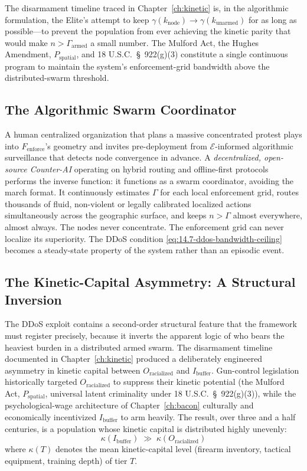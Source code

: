 The disarmament timeline traced in Chapter~\ref{ch:kinetic} is, in the algorithmic formulation, the Elite's attempt to keep $\gamma(k_{\text{node}}) \to \gamma(k_{\text{unarmed}})$ for as long as possible---to prevent the population from ever achieving the kinetic parity that would make $n > \Gamma_{\text{armed}}$ a small number. The Mulford Act, the Hughes Amendment, $P_{\text{spatial}}$, and 18 U.S.C.~\S~922(g)(3) constitute a single continuous program to maintain the system's enforcement-grid bandwidth above the distributed-swarm threshold.

\subsection{The Algorithmic Swarm Coordinator}

A human centralized organization that plans a massive concentrated protest plays into $F_{\text{enforce}}$'s geometry and invites pre-deployment from $\mathcal{E}$-informed algorithmic surveillance that detects node convergence in advance. A \textit{decentralized, open-source Counter-AI} operating on hybrid routing and offline-first protocols performs the inverse function: it functions as a swarm coordinator, avoiding the march format. It continuously estimates $\Gamma$ for each local enforcement grid, routes thousands of fluid, non-violent or legally calibrated localized actions simultaneously across the geographic surface, and keeps $n > \Gamma$ almost everywhere, almost always. The nodes never concentrate. The enforcement grid can never localize its superiority. The DDoS condition \eqref{eq:14.7-ddos-bandwidth-ceiling} becomes a steady-state property of the system rather than an episodic event.

\subsection{The Kinetic-Capital Asymmetry: A Structural Inversion}
\label{subsec:kinetic_asymmetry}

The DDoS exploit contains a second-order structural feature that the framework must register precisely, because it inverts the apparent logic of who bears the heaviest burden in a distributed armed swarm. The disarmament timeline documented in Chapter~\ref{ch:kinetic} produced a deliberately engineered asymmetry in kinetic capital between $O_{\text{racialized}}$ and $I_{\text{buffer}}$. Gun-control legislation historically targeted $O_{\text{racialized}}$ to suppress their kinetic potential (the Mulford Act, $P_{\text{spatial}}$, universal latent criminality under 18 U.S.C.~\S~922(g)(3)), while the psychological-wage architecture of Chapter~\ref{ch:bacon} culturally and economically incentivized $I_{\text{buffer}}$ to arm heavily. The result, over three and a half centuries, is a population whose kinetic capital is distributed highly unevenly:
\begin{equation}\label{eq:14.9-kinetic-capital-asymmetry}
\kappa(I_{\text{buffer}}) \;\gg\; \kappa(O_{\text{racialized}})
\end{equation}
where $\kappa(T)$ denotes the mean kinetic-capital level (firearm inventory, tactical equipment, training depth) of tier $T$.

